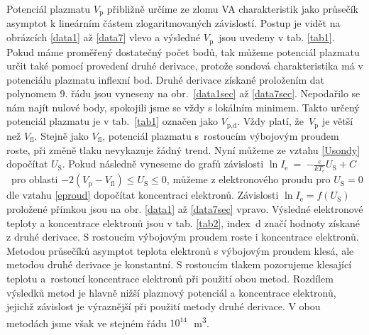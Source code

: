 \documentclass[a4paper,12pt]{article}
\begin{document}
\newpage
Potenciál plazmatu $V_\text{p}$ přibližně určíme ze zlomu VA charakteristik 
jako průsečík asymptot k lineárním částem zlogaritmovaných závislostí. Postup 
je vidět na obrázcích \ref{data1} až \ref{data7} vlevo a výsledné 
$V_\text{p}$~jsou uvedeny v tab. \ref{tab1}. Pokud máme proměřený dostatečný 
počet bodů, tak můžeme potenciál plazmatu určit také pomocí provedení druhé 
derivace, protože sondová charakteristika má v potenciálu plazmatu inflexní 
bod. Druhé derivace získané proložením dat polynomem 9. řádu
jsou vyneseny na obr.~\ref{data1sec} až \ref{data7sec}.
Nepodařilo se nám najít nulové body, spokojili jsme se vždy
s lokálním minimem.
Takto určený potenciál plazmatu je v tab.~\ref{tab1} označen jako 
$V_\text{p,d}$. Vždy platí, že~$V_\text{p}$ je větší než $V_\text{fl}$. Stejně 
jako 
$V_\text{fl}$, potenciál plazmatu s~rostoucím výbojovým proudem roste, při změně
tlaku nevykazuje žádný trend. Nyní můžeme ze vztahu \eqref{Usondy} dopočítat $U_\text{S}$. Pokud následně vyneseme do grafů závislosti $\ln
I_{\text{e}}$~=~$-\frac{e}{kT_e}U_\text{S}+C$~pro oblasti $-2(V_\text{p} - 
V_\text{{fl}}) \leq U_\text{S} \leq 0$, můžeme z
elektronového proudu pro $U_\text{S} = 0$ dle vztahu \eqref{eproud} dopočítat koncentraci elektronů. Závislosti $\ln I_{\text{e}} =
f(U_\text{S})$ proložené přímkou jsou na obr. \ref{data1} až 
\ref{data7sec} vpravo. Výsledné elektronové teploty a koncentrace
elektronů jsou v tab. \ref{tab2}, index~d značí hodnoty získané
z druhé derivace. S rostoucím výbojovým proudem roste i 
koncentrace elektronů. Metodou průsečíků asymptot teplota elektronů s výbojovým 
proudem klesá, ale metodou druhé derivace je konstantní. S rostoucím
tlakem pozorujeme klesající teplotu a~rostoucí koncentrace elektronů při 
použití obou metod. Rozdílem výsledků metod je hlavně nižší plazmový potenciál 
a koncentrace elektronů, jejichž závislost je výraznější při použití metody 
druhé derivace. V obou metodách jsme však ve stejném řádu 
$10^{14}$\,\si{\per\cubic\meter}.
\end{document}
